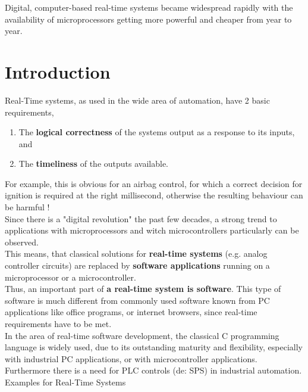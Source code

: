 Digital, computer-based real-time systems became widespread rapidly with the availability of microprocessors getting more powerful and cheaper from year to year.

\section{ Introduction}

Real-Time systems, as used in the wide area of automation, have 2 basic requirements,

\begin{enumerate}
	\item  The \textbf{logical correctness} of the systems output as a response to its inputs, and
	\item  The \textbf{timeliness} of the outputs available.
\end{enumerate}


For example, this is obvious for an airbag control, for which a correct decision for ignition is required at the right millisecond, otherwise the resulting behaviour can be harmful !\\

Since there is a "digital revolution" the past few decades, a strong trend to applications with microprocessors and witch microcontrollers particularly can be observed.\\

This means, that classical solutions for \textbf{real-time systems} (e.g. analog controller circuits) are replaced by \textbf{software applications} running on a microprocessor or a microcontroller.\\

Thus, an important part of \textbf{a real-time system is software}. This type of software is much different from commonly used software known from PC applications like office programs, or internet browsers, since real-time requirements have to be met.\\

In the area of real-time software development, the classical C programming language is widely used, due to its outstanding maturity and flexibility, especially with industrial PC applications, or with microcontroller applications.\\

Furthermore there is a need for PLC controls (de: SPS) in industrial automation.\\

Examples for Real-Time Systems

